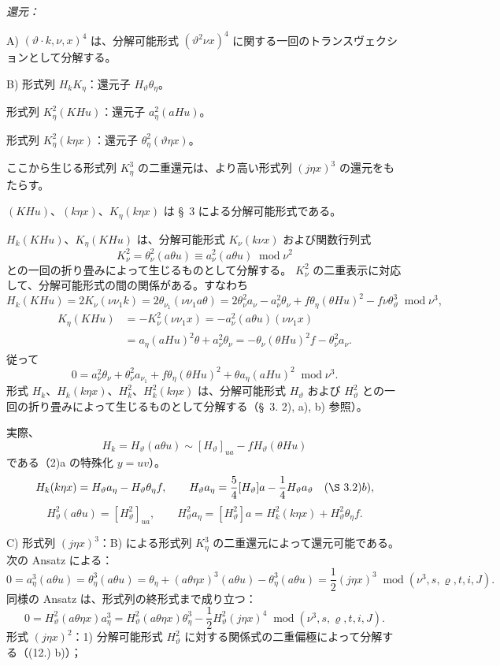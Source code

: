 \documentclass[11pt]{jlreq}
\newcommand{\R}{\varrho}
\newcommand{\modu}[1]{\;\operatorname{mod} #1}
\begin{document}
\noindent\emph{還元：}

\noindent A) $(\vartheta\cdot k,\nu,x)^4$ は、分解可能形式 $(\vartheta^2\nu x)^4$ に関する一回のトランスヴェクションとして分解する。

\noindent B) 形式列 $H_kK_\eta$：還元子 $H_\vartheta\theta_\eta$。

形式列 $K_\eta^2(KHu)$：還元子 $a_\eta^2(aHu)$。

形式列 $K_\eta^2(k\eta x)$：還元子 $\theta_\eta^2(\vartheta\eta x)$。

ここから生じる形式列 $K_\eta^3$ の二重還元は、より高い形式列 $(j\eta x)^3$ の還元をもたらす。

$(KHu)$、$(k\eta x)$、$K_\eta(k\eta x)$ は \S\ 3 による分解可能形式である。

$H_k(KHu)$、$K_\eta(KHu)$ は、分解可能形式 $K_\nu(k\nu x)$ および関数行列式
\[
K_\nu^2=\theta_\nu^2(a\theta u)\equiv a_\nu^2(a\theta u)\modu{\nu^2}
\]
との一回の折り畳みによって生じるものとして分解する。
$K_\nu^2$ の二重表示に対応して、分解可能形式の間の関係がある。すなわち
\[
H_k(KHu)=2K_\nu(\nu\nu_1k)=2\theta_{\nu_1}(\nu\nu_1a\theta)
=2\theta_\nu^2a_\nu-a_\nu^2\theta_\nu+f\theta_\eta(\theta Hu)^2-f\nu\theta_\vartheta^3
\modu{\nu^3},
\]
\[
\begin{aligned}
K_\eta(KHu)&=-K_\nu^2(\nu\nu_1x)
=-a_\nu^2(a\theta u)(\nu\nu_1x)\\
&=a_\eta(aHu)^2\theta+a_\nu^2\theta_\nu
=-\theta_\nu(\theta Hu)^2f-\theta_\nu^2a_\nu.
\end{aligned}
\]
従って
\[
\tag{17}
0=a_\nu^2\theta_\nu+\theta_\nu^2a_{\nu_1}+f\theta_\eta(\theta Hu)^2+\theta a_\eta(aHu)^2\modu{\nu^3}.
\]
形式 $H_k$、$H_k(k\eta x)$、$H_k^2$、$H_k^2(k\eta x)$ は、分解可能形式 $H_\vartheta$ および $H_\vartheta^2$ との一回の折り畳みによって生じるものとして分解する（\S\ 3. 2), a), b) 参照）。

実際、
\[
H_k=H_\vartheta(a\theta u)\sim [H_\vartheta]_{ua}-fH_\vartheta(\theta Hu)
\]
である（2)a の特殊化 $y=uv$）。
\[
H_k(k\eta x)=H_\vartheta a_\eta-H_\vartheta\theta_\eta f,
\qquad
H_\vartheta a_\eta=\frac54[H_\vartheta]a-\frac14H_\vartheta a_\vartheta
\quad(\S\ 3. 2)b),
\]
\[
H_\vartheta^2(a\theta u)=[H_\vartheta^2]_{ua},
\qquad
H_\vartheta^2a_\eta=[H_\vartheta^2]a=H_k^2(k\eta x)+H_\vartheta^2\theta_\eta f.
\]

\noindent C) 形式列 $(j\eta x)^3$：B) による形式列 $K_\eta^3$ の二重還元によって還元可能である。次の Ansatz による：
\[
0=a_\eta^3(a\theta u)=\theta_\eta^3(a\theta u)
=\theta_\eta+(a\theta\eta x)^3(a\theta u)-\theta_\eta^3(a\theta u)
=\frac12(j\eta x)^3\modu{(\nu^3,s,\R,t,i,J)}.
\]
同様の Ansatz は、形式列の終形式まで成り立つ：
\[
0=H_\vartheta^2(a\theta\eta x)a_\eta^3
=H_\vartheta^2(a\theta\eta x)\theta_\eta^3
-\frac12H_\vartheta^2(j\eta x)^4\modu{(\nu^3,s,\R,t,i,J)}.
\]
形式 $(j\eta x)^2$：1) 分解可能形式 $H_\vartheta^2$ に対する関係式の二重偏極によって分解する（(12.) b)）；
\end{document}
